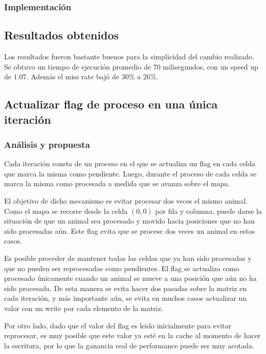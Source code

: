 \documentclass[a4paper,11pt]{article}
\begin{document}
\subsubsection{Implementación}



\subsection{Resultados obtenidos}

Los resultados fueron bastante buenos para la simplicidad del cambio realizado.
Se obtuvo un tiempo de ejecución promedio de 70 milisegundos, con un speed up
de \(1.07\). Además el miss rate bajó de 30\% a 26\%.

\subsection{Actualizar flag de proceso en una única iteración}

\subsubsection{Análisis y propuesta}

Cada iteración consta de un proceso en el que se actualiza un flag en cada
celda que marca la misma como pendiente. Luego, durante el proceso de cada
celda se marca la misma como procesada a medida que se avanza sobre el mapa.

El objetivo de dicho mecanismo es evitar procesar dos veces el mismo animal.
Como el mapa se recorre desde la celda \((0, 0)\) por fila y columna, puede
darse la situación de que un animal sea procesado y movido hacia posiciones que
no han sido procesadas aún. Este flag evita que se procese dos veces un animal
en estos casos.

Es posible proceder de mantener todas las celdas que ya han sido procesadas y
que no pueden ser reprocesadas como pendientes. El flag se actualiza como
procesado únicamente cuando un animal se mueve a una posición que aún no ha
sido procesada. De esta manera se evita hacer dos pasadas sobre la matriz en
cada iteración, y más importante aún, se evita en muchos casos actualizar un
valor con un write por cada elemento de la matriz.

Por otro lado, dado que el valor del flag es leido inicialmente para evitar
reprocesar, es muy posible que este valor ya esté en la cache al momento de
hacer la escritura, por lo que la ganancia real de performance puede ser muy
acotada.
\end{document}

